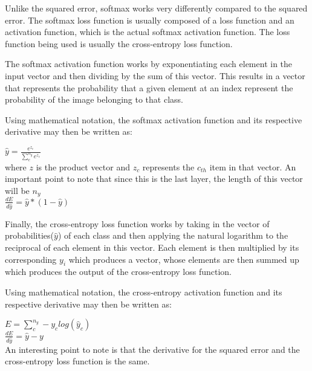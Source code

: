 Unlike the squared error, softmax works very differently compared to the squared error. The softmax loss function is usually composed of a loss function and an activation function, which is the actual softmax activation function. The loss function being used is usually the cross-entropy loss function.

The softmax activation function works by exponentiating each element in the input vector and then dividing by the sum of this vector. This results in a vector that represents the probability that a given element at an index represent the probability of the image belonging to that class.

Using mathematical notation, the softmax activation function and its respective derivative may then be written as:

\begin{center}
    $ \hat{y} = \frac{e^{z_c}}{\sum_c^{n_y} {e^{z_c}}}$\\
    where $z$ is the product vector and $z_c$ represents the $c_{th}$ item in that vector. An important point to note that since this is the last layer, the length of this vector will be $n_y$ \\
    $ \frac{dE}{d\hat{y}} = \hat{y} * (1-\hat{y}) $
\end{center}

Finally, the cross-entropy loss function works by taking in the vector of probabilities($\hat{y}$) of each class and then applying the natural logarithm to the reciprocal of each element in this vector. Each element is then multiplied by its corresponding $y_i$ which produces a vector, whose elements are then summed up which produces the output of the cross-entropy loss function. 

Using mathematical notation, the cross-entropy activation function and its respective derivative may then be written as:

\begin{center}
    $ E = \sum_c^{n_y} -y_{c}{ log(\hat{y}_{c})} $ \\
    $ \frac{dE}{d\hat{y}} = \hat{y} - y $ \\
    An interesting point to note is that the derivative for the squared error and the cross-entropy loss function is the same.
\end{center}